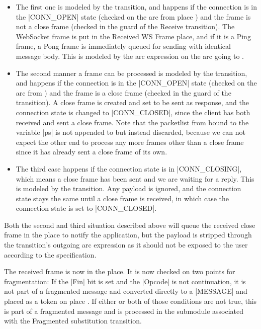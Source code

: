 		\begin{itemize}
			\item The first one is modeled by the  transition, and
			happens if the connection is in the |CONN_OPEN| state (checked on the arc
			from place ) and the frame is not a close frame
			(checked in the guard of the Receive transition). The WebSocket frame is put
			in the Received WS Frame place, and if it is a Ping frame, a Pong frame is
			immediately queued for sending with identical message body. This is modeled
			by the arc expression on the arc going to .
			
			\item The second manner a frame can be processed is modeled by the
			 transition, and happens if the connection is in the
			|CONN_OPEN| state (checked on the arc from ) and the frame is a close frame (checked in the guard of the  transition). A close frame is
			created and set to be sent as response, and the connection state is changed
			to |CONN_CLOSED|, since the client has both received and sent a close
			frame. Note that the packetlist from  bound to the
			variable |ps| is not appended to but instead discarded, because we can not
			expect the other end to process any more frames other than a close frame
			since it has already sent a close frame of its own.
			
			\item The third case happens if the connection state is in
			|CONN_CLOSING|, which means a close frame has been sent and we are
			waiting for a reply. This is modeled by the 
			transition. Any payload is ignored, and the connection state stays the same
			until a close frame is received, in which case the connection state is set to |CONN_CLOSED|. 
		\end{itemize}
		
		Both the second and third situation described above will queue the received
		close frame in the  place to notify the application, but the payload is
		stripped through the  transition's outgoing arc
		expression as it should not be exposed to the user according to the
		specification.
		
		The received frame is now in the  place. It is now checked
		on two points for fragmentation:
		If the |Fin| bit is set and the |Opcode| is not continuation, it is not part of
		a fragmented message and converted directly to a |MESSAGE| and placed as a
		token on place .
		If either or both of those conditions are not true, this is part of a fragmented message and is processed
		in the  submodule associated with the Fragmented
		substitution transition.
		
